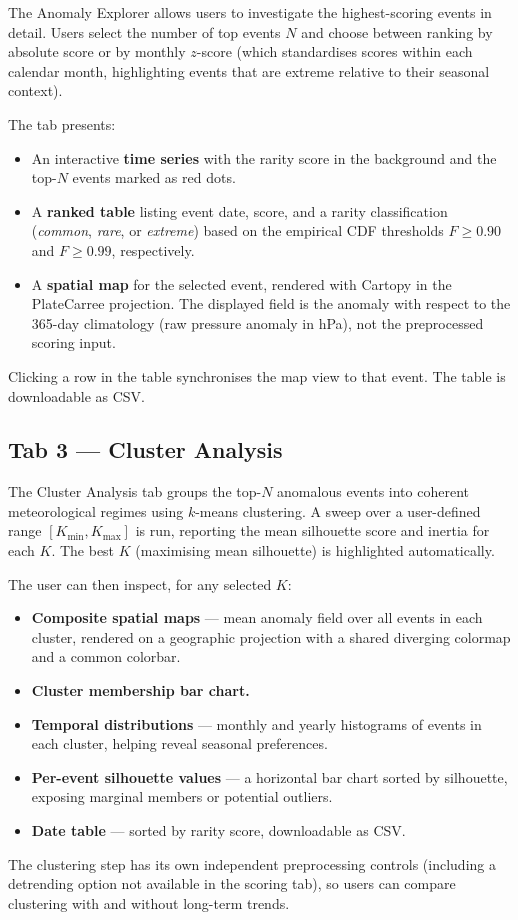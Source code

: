\documentclass[runningheads]{llncs}
\begin{document}
The Anomaly Explorer allows users to investigate the highest-scoring events
in detail.
Users select the number of top events $N$ and choose between ranking by
absolute score or by monthly $z$-score (which standardises scores within
each calendar month, highlighting events that are extreme relative to their
seasonal context).

The tab presents:
\begin{itemize}
  \item An interactive \textbf{time series} with the rarity score in the
        background and the top-$N$ events marked as red dots.
  \item A \textbf{ranked table} listing event date, score, and a rarity
        classification (\emph{common}, \emph{rare}, or \emph{extreme})
        based on the empirical CDF thresholds $F \geq 0.90$ and
        $F \geq 0.99$, respectively.
  \item A \textbf{spatial map} for the selected event, rendered with
        Cartopy in the PlateCarree projection.
        The displayed field is the anomaly with respect to the 365-day
        climatology (raw pressure anomaly in hPa), not the preprocessed
        scoring input.
\end{itemize}
Clicking a row in the table synchronises the map view to that event.
The table is downloadable as CSV.

\subsection{Tab 3 — Cluster Analysis}

The Cluster Analysis tab groups the top-$N$ anomalous events into coherent
meteorological regimes using $k$-means clustering.
A sweep over a user-defined range $[K_{\min}, K_{\max}]$ is run, reporting
the mean silhouette score and inertia for each $K$.
The best $K$ (maximising mean silhouette) is highlighted automatically.

The user can then inspect, for any selected $K$:
\begin{itemize}
  \item \textbf{Composite spatial maps} — mean anomaly field over all events
        in each cluster, rendered on a geographic projection with a shared
        diverging colormap and a common colorbar.
  \item \textbf{Cluster membership bar chart.}
  \item \textbf{Temporal distributions} — monthly and yearly histograms of
        events in each cluster, helping reveal seasonal preferences.
  \item \textbf{Per-event silhouette values} — a horizontal bar chart sorted
        by silhouette, exposing marginal members or potential outliers.
  \item \textbf{Date table} — sorted by rarity score, downloadable as CSV.
\end{itemize}
The clustering step has its own independent preprocessing controls
(including a detrending option not available in the scoring tab), so users
can compare clustering with and without long-term trends.
\end{document}
